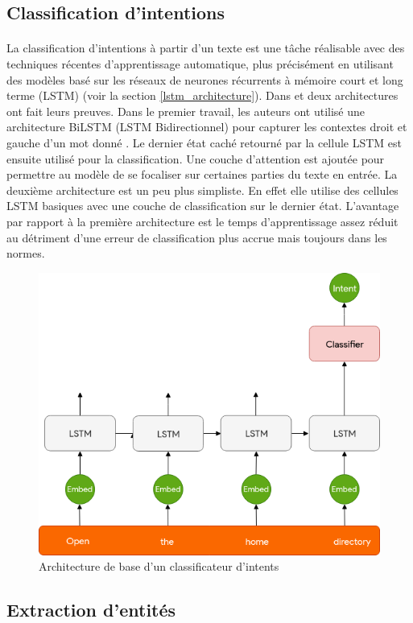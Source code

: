 	\subsection{Classification d'intentions}
		\paragraph{}
		La classification d'intentions à partir d'un texte est une tâche réalisable avec des techniques récentes d'apprentissage automatique, plus précisément en utilisant des modèles basé sur les réseaux de neurones récurrents à mémoire court et long terme (LSTM) (voir la section \ref{lstm_architecture}). Dans \cite{intent_classification} et \cite{intent_slots} deux architectures ont fait leurs preuves. Dans le premier travail, les auteurs ont utilisé une architecture BiLSTM (LSTM Bidirectionnel) pour capturer les contextes droit et gauche d'un mot donné \cite{blstm}. Le dernier état caché retourné par la cellule LSTM est ensuite utilisé pour la classification. Une couche d'attention est ajoutée \cite{attention_mechanism} pour permettre au modèle de se focaliser sur certaines parties du texte en entrée. La deuxième architecture est un peu plus simpliste. En effet elle utilise des cellules LSTM basiques avec une couche de classification sur le dernier état. L'avantage par rapport à la première architecture est le temps d'apprentissage assez réduit au détriment d'une erreur de classification plus accrue mais toujours dans les normes.
		\begin{figure}[H]
			\centering
			\label{LSTM_intent}
			\includegraphics[width=0.65\linewidth]{images/NLU/intent_classification.png}
			\caption{Architecture de base d'un classificateur d'intents \cite{intent_classification}}
		\end{figure}
	\subsection{Extraction d'entités}
